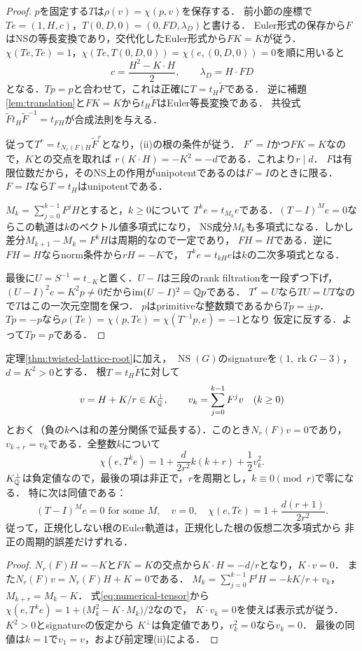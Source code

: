 \documentclass[11pt,a4paper]{ltjsarticle}
\begin{document}
\begin{proof}
$p$を固定する$T$は$\rho(v)=\chi(p,v)$を保存する．
前小節の座標で$Te=(1,H,c)$，$T(0,D,0)=(0,FD,\lambda_D)$と書ける．
Euler形式の保存から$F$はNSの等長変換であり，交代化したEuler形式から$FK=K$が従う．
$\chi(Te,Te)=1$，$\chi(Te,T(0,D,0))=\chi(e,(0,D,0))=0$を順に用いると
\[
 c=\frac{H^2-K\cdot H}{2},\qquad
 \lambda_D=H\cdot FD
\]
となる．$Tp=p$と合わせて，これは正確に$T=t_H\widetilde F$である．
逆に補題\ref{lem:translation}と$FK=K$から$t_H\widetilde F$はEuler等長変換である．
共役式$\widetilde F t_H\widetilde F^{-1}=t_{FH}$が合成法則を与える．

従って$T^r=t_{N_r(F)H}\widetilde F^r$となり，(ii)の根の条件が従う．
$F^r=I$かつ$FK=K$なので，$K$との交点を取れば
$r(K\cdot H)=-K^2=-d$である．これより$r\mid d$．
$F$は有限位数だから，そのNS上の作用がunipotentであるのは$F=I$のときに限る．
$F=I$なら$T=t_H$はunipotentである．

$M_k=\sum_{j=0}^{k-1}F^jH$とすると，$k\ge0$について
$T^ke=t_{M_k}e$である．$(T-I)^Me=0$ならこの軌道は$k$のベクトル値多項式になり，
NS成分$M_k$も多項式になる．しかし差分$M_{k+1}-M_k=F^kH$は周期的なので一定であり，
$FH=H$である．逆に$FH=H$ならnorm条件から$rH=-K$で，
$T^ke=t_{kH}e$は$k$の二次多項式となる．

最後に$U=S^{-1}=t_{-K}$と置く．$U-I$は三段のrank filtrationを一段ずつ下げ，
$(U-I)^2e=K^2p\ne0$だから$\operatorname{im}(U-I)^2=\mathbb Q p$である．
$T^r=U$なら$TU=UT$なので$T$はこの一次元空間を保つ．
$p$はprimitiveな整数類であるから$Tp=\pm p$．
$Tp=-p$なら$\rho(Te)=\chi(p,Te)=\chi(T^{-1}p,e)=-1$となり
仮定に反する．よって$Tp=p$である．
\end{proof}

\begin{corollary}[周期的なEuler欠損と正規化の検出]\label{cor:periodic-deficit}
定理\ref{thm:twisted-lattice-root}に加え，
$\operatorname{NS}(G)$のsignatureを$(1,\operatorname{rk}G-3)$，$d=K^2>0$とする．
根$T=t_H\widetilde F$に対して
\[
 v=H+K/r\in K^\perp_{\mathbb Q},\qquad
 v_k=\sum_{j=0}^{k-1}F^jv\quad(k\ge0)
\]
とおく（負の$k$へは和の差分関係で延長する）．このとき$N_r(F)v=0$であり，
$v_{k+r}=v_k$である．全整数$k$について
\begin{equation}\label{eq:periodic-deficit}
 \boxed{\quad\chi(e,T^ke)=1+\frac{d}{2r^2}k(k+r)+\frac12v_k^2.\quad}
\end{equation}
$K^\perp_{\mathbb Q}$は負定値なので，最後の項は非正で，$r$を周期とし，$k\equiv0\pmod r$で零になる．
特に次は同値である：
\[
 (T-I)^Me=0\text{ for some }M,\quad
 v=0,\quad
 \chi(e,Te)=1+\frac{d(r+1)}{2r^2}.
\]
従って，正規化しない根のEuler軌道は，正規化した根の仮想二次多項式から
非正の周期的誤差だけずれる．
\end{corollary}
\begin{proof}
$N_r(F)H=-K$と$FK=K$の交点から$K\cdot H=-d/r$となり，$K\cdot v=0$．
また$N_r(F)v=N_r(F)H+K=0$である．
$M_k=\sum_{j=0}^{k-1}F^jH=-kK/r+v_k$，$M_{k+r}=M_k-K$．
式\eqref{eq:numerical-tensor}から
$\chi(e,T^ke)=1+\bigl(M_k^2-K\cdot M_k\bigr)/2$なので，
$K\cdot v_k=0$を使えば表示式が従う．$K^2>0$とsignatureの仮定から
$K^\perp$は負定値であり，$v_k^2=0$なら$v_k=0$．
最後の同値は$k=1$で$v_1=v$，および前定理(ii)による．
\end{proof}
\end{document}

